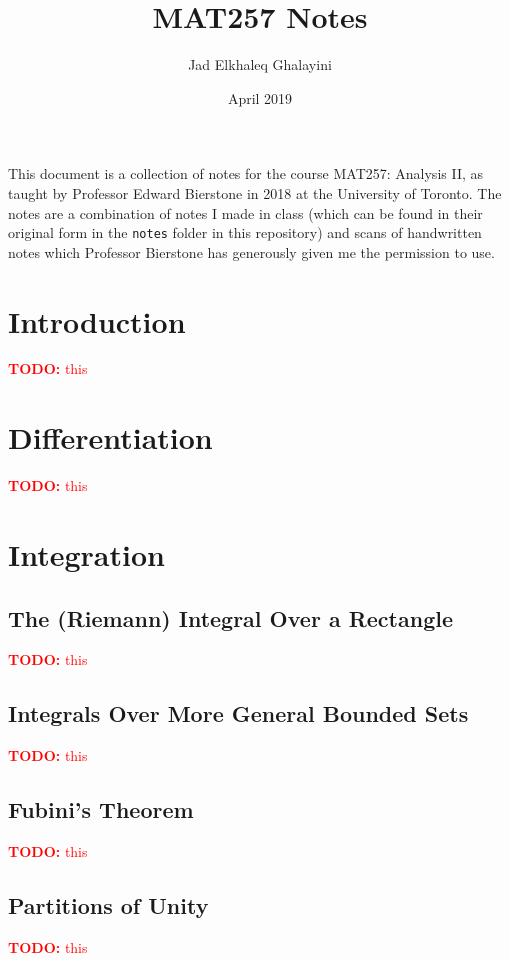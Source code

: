 \documentclass{article}
\title{MAT257 Notes}
\author{Jad Elkhaleq Ghalayini}
\date{April 2019}
\newcommand{\TODO}[1]{\textcolor{red}{\textbf{TODO:} #1}}
\begin{document}
\maketitle

This document is a collection of notes for the course MAT257: Analysis II, as taught by Professor Edward Bierstone in 2018 at the University of Toronto. The notes are a combination of notes I made in class (which can be found in their original form in the \verb|notes| folder in this repository) and scans of handwritten notes which Professor Bierstone has generously given me the permission to use.

\section{Introduction}

\TODO{this}

\section{Differentiation}

\TODO{this}

\section{Integration}

\subsection{The (Riemann) Integral Over a Rectangle}

\TODO{this}

\subsection{Integrals Over More General Bounded Sets}

\TODO{this}

\subsection{Fubini's Theorem}

\TODO{this}

\subsection{Partitions of Unity}

\TODO{this}
\end{document}
